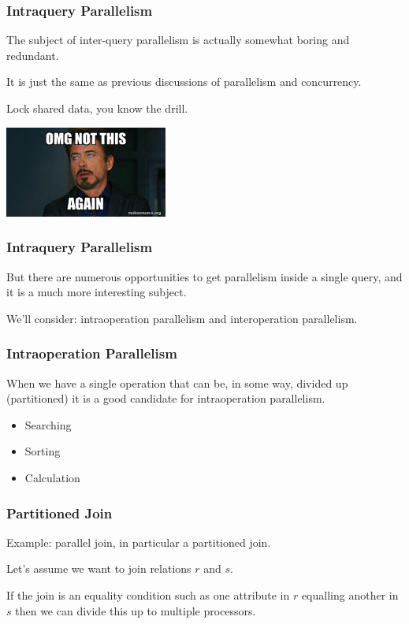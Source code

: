 \begin{frame}
\frametitle{Intraquery Parallelism}

The subject of inter-query parallelism is actually somewhat boring and redundant.

It is just the same as previous discussions of parallelism and concurrency. 

Lock shared data, you know the drill. 

\begin{center}
	\includegraphics[width=0.4\textwidth]{images/notagain.jpg}
\end{center}

\end{frame}


\begin{frame}
\frametitle{Intraquery Parallelism}

But there are numerous opportunities to get parallelism inside a single query, and it is a much more interesting subject. 

We'll consider: intraoperation parallelism and interoperation parallelism.

\end{frame}



\begin{frame}
\frametitle{Intraoperation Parallelism}

When we have a single operation that can be, in some way, divided up (partitioned) it is a good candidate for intraoperation parallelism. 

\begin{itemize}
	\item Searching
	\item Sorting
	\item Calculation
\end{itemize}

\end{frame}

\begin{frame}
\frametitle{Partitioned Join}

Example: parallel join, in particular a partitioned join. 

Let's assume we want to join relations $r$ and $s$. 

If the join is an equality condition such as one attribute in $r$ equalling another in $s$ then we can divide this up to multiple processors.

\end{frame}


